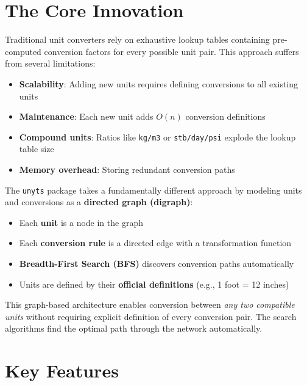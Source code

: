 \documentclass[11pt,a4paper]{report}
\begin{document}
\section{The Core Innovation}

Traditional unit converters rely on exhaustive lookup tables containing pre-computed conversion factors for every possible unit pair. This approach suffers from several limitations:
\begin{itemize}[leftmargin=*]
  \item \textbf{Scalability}: Adding new units requires defining conversions to all existing units
  \item \textbf{Maintenance}: Each new unit adds $O(n)$ conversion definitions
  \item \textbf{Compound units}: Ratios like \texttt{kg/m3} or \texttt{stb/day/psi} explode the lookup table size
  \item \textbf{Memory overhead}: Storing redundant conversion paths
\end{itemize}

The \texttt{unyts} package takes a fundamentally different approach by modeling units and conversions as a \textbf{directed graph (digraph)}:
\begin{itemize}[leftmargin=*]
  \item Each \textbf{unit} is a node in the graph
  \item Each \textbf{conversion rule} is a directed edge with a transformation function
  \item \textbf{Breadth-First Search (BFS)} discovers conversion paths automatically
  \item Units are defined by their \textbf{official definitions} (e.g., 1 foot = 12 inches)
\end{itemize}

This graph-based architecture enables conversion between \emph{any two compatible units} without requiring explicit definition of every conversion pair. The search algorithms find the optimal path through the network automatically.

\section{Key Features}
\end{document}
